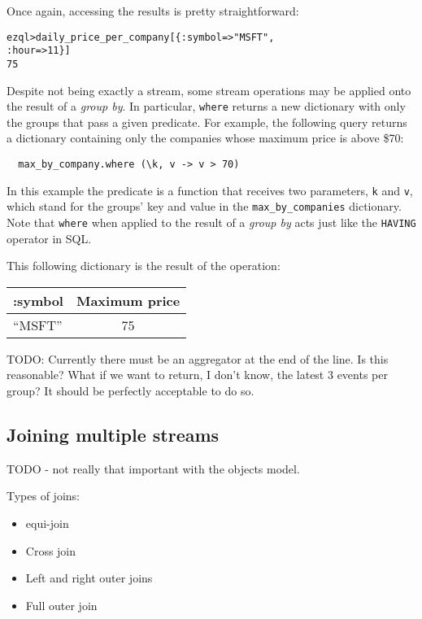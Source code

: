 \documentclass{report}
\newenvironment{evaluation}
{
  \framed
  \begin{alltt}
}
{
  \end{alltt}
  \endframed
}
\begin{document}
Once again, accessing the results is pretty straightforward:

\begin{evaluation}
  ezql> daily_price_per_company[\{ :symbol => "MSFT",
                                  :hour   => 11 \}]
  75
\end{evaluation}

Despite not being exactly a stream, some stream operations may be
applied onto the result of a \emph{group by}. In particular,
\verb=where= returns a new dictionary with only the groups that pass a
given predicate. For example, the following query returns a dictionary
containing only the companies whose maximum price is above \$70:

\begin{verbatim}
  max_by_company.where (\k, v -> v > 70)
\end{verbatim}

In this example the predicate is a function that receives two
parameters, \verb=k= and \verb=v=, which stand for the groups' key and
value in the \verb=max_by_companies= dictionary. Note that
\verb=where= when applied to the result of a \emph{group by} acts just
like the \verb=HAVING= operator in SQL.

This following dictionary is the result of the operation:

\begin{tabular}{ |l|c| }
  \hline
  :symbol & Maximum price \\
  \hline
  ``MSFT'' & 75 \\
  \hline
\end{tabular}


TODO: Currently there must be an aggregator at the end of the line. Is
this reasonable? What if we want to return, I don't know, the latest 3
events per group? It should be perfectly acceptable to do so.

\subsection{Joining multiple streams}
\label{sec:join}

TODO - not really that important with the objects model.

Types of joins:
\begin{itemize}
\item equi-join
\item Cross join
\item Left and right outer joins
\item Full outer join
\end{itemize}
\end{document}
